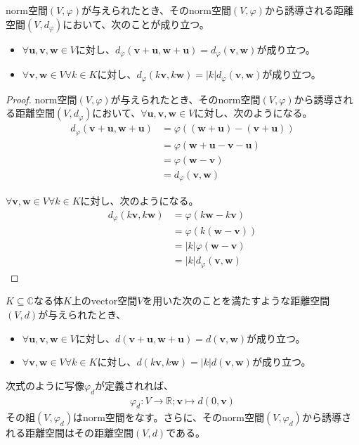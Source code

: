 \documentclass[dvipdfmx]{jsarticle}
\begin{document}
\begin{thm}\label{2.3.1.2}
norm空間$(V,\varphi)$が与えられたとき、そのnorm空間$(V,\varphi)$から誘導される距離空間$\left( V,d_{\varphi} \right)$において、次のことが成り立つ。
\begin{itemize}
\item
  $\forall\mathbf{u},\mathbf{v},\mathbf{w} \in V$に対し、$d_{\varphi}\left( \mathbf{v + u,w + u} \right) = d_{\varphi}\left( \mathbf{v,w} \right)$が成り立つ。
\item
  $\forall\mathbf{v,w} \in V\forall k \in K$に対し、$d_{\varphi}\left( k\mathbf{v},k\mathbf{w} \right) = |k|d_{\varphi}\left( \mathbf{v,w} \right)$が成り立つ。
\end{itemize}
\end{thm}
\begin{proof}
norm空間$(V,\varphi)$が与えられたとき、そのnorm空間$(V,\varphi)$から誘導される距離空間$\left( V,d_{\varphi} \right)$において、$\forall\mathbf{u},\mathbf{v},\mathbf{w} \in V$に対し、次のようになる。
\begin{align*}
d_{\varphi}\left( \mathbf{v + u,}\mathbf{w +}\mathbf{u} \right) &= \varphi\left( \left( \mathbf{w + u} \right) - \left( \mathbf{v + u} \right) \right)\\
&= \varphi\left( \mathbf{w + u} - \mathbf{v - u} \right)\\
&= \varphi\left( \mathbf{w} - \mathbf{v} \right)\\
&= d_{\varphi}\left( \mathbf{v,w} \right)
\end{align*}\par
$\forall\mathbf{v,w} \in V\forall k \in K$に対し、次のようになる。
\begin{align*}
d_{\varphi}\left( k\mathbf{v},k\mathbf{w} \right) &= \varphi\left( k\mathbf{w} - k\mathbf{v} \right)\\
&= \varphi\left( k\left( \mathbf{w} - \mathbf{v} \right) \right)\\
&= |k|\varphi\left( \mathbf{w} - \mathbf{v} \right)\\
&= |k|d_{\varphi}\left( \mathbf{v,w} \right)
\end{align*}
\end{proof}
\begin{thm}\label{2.3.1.3}
$K \subseteq \mathbb{C}$なる体$K$上のvector空間$V$を用いた次のことを満たすような距離空間$(V,d)$が与えられたとき、
\begin{itemize}
\item
  $\forall\mathbf{u},\mathbf{v},\mathbf{w} \in V$に対し、$d\left( \mathbf{v + u,w + u} \right) = d\left( \mathbf{v,w} \right)$が成り立つ。
\item
  $\forall\mathbf{v,w} \in V\forall k \in K$に対し、$d\left( k\mathbf{v},k\mathbf{w} \right) = |k|d\left( \mathbf{v,w} \right)$が成り立つ。
\end{itemize}
次式のように写像$\varphi_{d}$が定義されれば、
\begin{align*}
\varphi_{d}:V \rightarrow \mathbb{R};\mathbf{v} \mapsto d\left( 0,\mathbf{v} \right)
\end{align*}
その組$\left( V,\varphi_{d} \right)$はnorm空間をなす。さらに、そのnorm空間$\left( V,\varphi_{d} \right)$から誘導される距離空間はその距離空間$(V,d)$である。
\end{thm}
\end{document}
